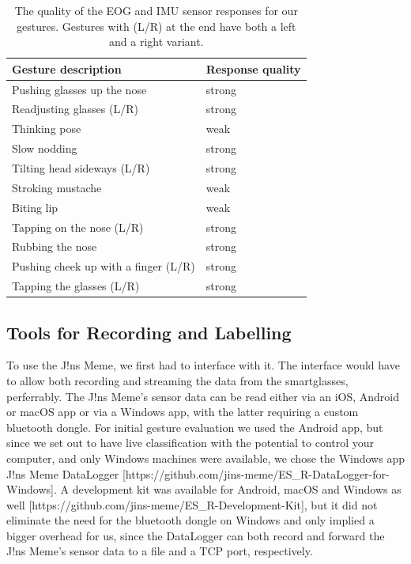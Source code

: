 \documentclass[runningheads]{llncs}
\begin{document}
\begin{table}
\centering
\caption{The quality of the EOG and IMU sensor responses for our gestures. Gestures 
        with (L/R) at the end have both a left and a right variant.}\label{tab:responses}
\begin{tabular}{|l|l|}
    \hline
    Gesture description & Response quality\\
    \hline
    Pushing glasses up the nose & strong\\
    Readjusting glasses (L/R)& strong\\
    Thinking pose & weak\\
    Slow nodding & strong\\
    Tilting head sideways (L/R)& strong\\
    Stroking mustache & weak\\
    Biting lip & weak\\
    Tapping on the nose (L/R)& strong\\
    Rubbing the nose & strong\\
    Pushing cheek up with a finger (L/R)& strong\\
    Tapping the glasses (L/R)& strong\\\hline
\end{tabular}
\end{table}

\subsection{Tools for Recording and Labelling}
To use the J!ns Meme, we first had to interface with it. The interface would have to allow
both recording and streaming the data from the smartglasses, perferrably.
The J!ns Meme's sensor data can be read either via an iOS, Android or macOS app
or via a Windows app, with the latter requiring a custom bluetooth dongle. For
initial gesture evaluation we used the Android app, but since we set out to have
live classification with the potential to control your computer, and only Windows
machines were available, we chose the Windows app J!ns Meme DataLogger
[https://github.com/jins-meme/ES\_R-DataLogger-for-Windows]. A development kit was
available for Android, macOS and Windows as well
[https://github.com/jins-meme/ES\_R-Development-Kit], but it did not eliminate the
need for the bluetooth dongle on Windows and only implied a bigger overhead for us,
since the DataLogger can both record and forward the J!ns Meme's sensor data to a
file and a TCP port, respectively.
\end{document}
